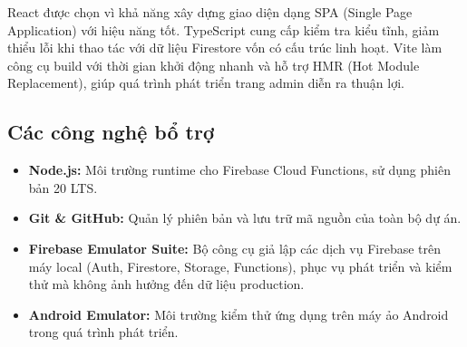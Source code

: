 React được chọn vì khả năng xây dựng giao diện dạng SPA (Single Page Application) với hiệu năng tốt. TypeScript cung cấp kiểm tra kiểu tĩnh, giảm thiểu lỗi khi thao tác với dữ liệu Firestore vốn có cấu trúc linh hoạt. Vite làm công cụ build với thời gian khởi động nhanh và hỗ trợ HMR (Hot Module Replacement), giúp quá trình phát triển trang admin diễn ra thuận lợi.

\subsection{Các công nghệ bổ trợ}

\begin{itemize}
    \item \textbf{Node.js:} Môi trường runtime cho Firebase Cloud Functions, sử dụng phiên bản 20 LTS.
    \item \textbf{Git \& GitHub:} Quản lý phiên bản và lưu trữ mã nguồn của toàn bộ dự án.
    \item \textbf{Firebase Emulator Suite:} Bộ công cụ giả lập các dịch vụ Firebase trên máy local (Auth, Firestore, Storage, Functions), phục vụ phát triển và kiểm thử mà không ảnh hưởng đến dữ liệu production.
    \item \textbf{Android Emulator:} Môi trường kiểm thử ứng dụng trên máy ảo Android trong quá trình phát triển.
\end{itemize}
